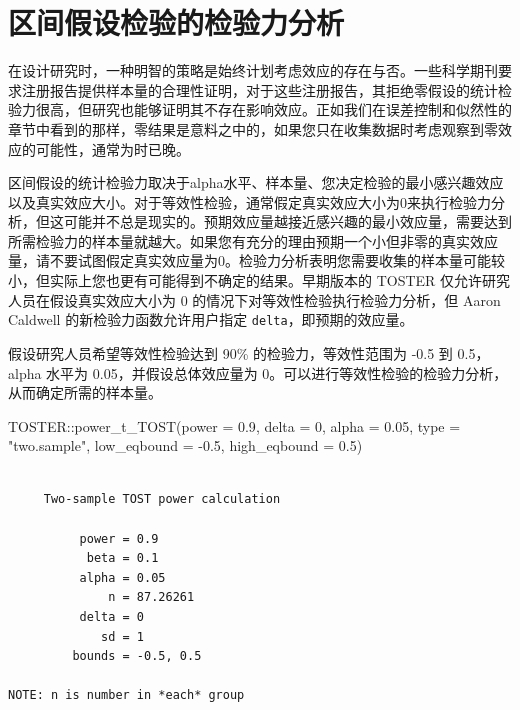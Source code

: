 \documentclass[
  letterpaper,
  DIV=11,
  numbers=noendperiod]{scrreprt}
\newenvironment{Shaded}{\begin{snugshade}}{\end{snugshade}}
\newcommand{\AttributeTok}[1]{\textcolor[rgb]{0.40,0.45,0.13}{#1}}
\newcommand{\DecValTok}[1]{\textcolor[rgb]{0.68,0.00,0.00}{#1}}
\newcommand{\FloatTok}[1]{\textcolor[rgb]{0.68,0.00,0.00}{#1}}
\newcommand{\FunctionTok}[1]{\textcolor[rgb]{0.28,0.35,0.67}{#1}}
\newcommand{\NormalTok}[1]{\textcolor[rgb]{0.00,0.23,0.31}{#1}}
\newcommand{\SpecialCharTok}[1]{\textcolor[rgb]{0.37,0.37,0.37}{#1}}
\newcommand{\StringTok}[1]{\textcolor[rgb]{0.13,0.47,0.30}{#1}}
\begin{document}
\hypertarget{ux533aux95f4ux5047ux8bbeux68c0ux9a8cux7684ux68c0ux9a8cux529bux5206ux6790}{%
\section{区间假设检验的检验力分析}\label{ux533aux95f4ux5047ux8bbeux68c0ux9a8cux7684ux68c0ux9a8cux529bux5206ux6790}}

在设计研究时，一种明智的策略是始终计划考虑效应的存在与否。一些科学期刊要求注册报告提供样本量的合理性证明，对于这些注册报告，其拒绝零假设的统计检验力很高，但研究也能够证明其不存在影响效应。正如我们在误差控制和似然性的章节中看到的那样，零结果是意料之中的，如果您只在收集数据时考虑观察到零效应的可能性，通常为时已晚。

区间假设的统计检验力取决于alpha水平、样本量、您决定检验的最小感兴趣效应以及真实效应大小。对于等效性检验，通常假定真实效应大小为0来执行检验力分析，但这可能并不总是现实的。预期效应量越接近感兴趣的最小效应量，需要达到所需检验力的样本量就越大。如果您有充分的理由预期一个小但非零的真实效应量，请不要试图假定真实效应量为0。检验力分析表明您需要收集的样本量可能较小，但实际上您也更有可能得到不确定的结果。早期版本的
TOSTER 仅允许研究人员在假设真实效应大小为 0
的情况下对等效性检验执行检验力分析，但 Aaron Caldwell
的新检验力函数允许用户指定 \texttt{delta}，即预期的效应量。

假设研究人员希望等效性检验达到 90\% 的检验力，等效性范围为 -0.5 到
0.5，alpha 水平为 0.05，并假设总体效应量为
0。可以进行等效性检验的检验力分析，从而确定所需的样本量。

\begin{Shaded}
\begin{Highlighting}[]
\NormalTok{TOSTER}\SpecialCharTok{::}\FunctionTok{power\_t\_TOST}\NormalTok{(}\AttributeTok{power =} \FloatTok{0.9}\NormalTok{, }\AttributeTok{delta =} \DecValTok{0}\NormalTok{,}
                     \AttributeTok{alpha =} \FloatTok{0.05}\NormalTok{, }\AttributeTok{type =} \StringTok{"two.sample"}\NormalTok{,}
                     \AttributeTok{low\_eqbound =} \SpecialCharTok{{-}}\FloatTok{0.5}\NormalTok{, }\AttributeTok{high\_eqbound =} \FloatTok{0.5}\NormalTok{)}
\end{Highlighting}
\end{Shaded}

\begin{verbatim}

     Two-sample TOST power calculation 

          power = 0.9
           beta = 0.1
          alpha = 0.05
              n = 87.26261
          delta = 0
             sd = 1
         bounds = -0.5, 0.5

NOTE: n is number in *each* group
\end{verbatim}
\end{document}
